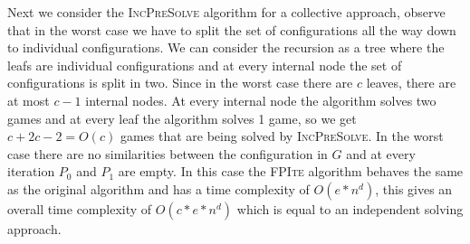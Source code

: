 Next we consider the \textsc{IncPreSolve} algorithm for a collective approach, observe that in the worst case we have to split the set of configurations all the way down to individual configurations. We can consider the recursion as a tree where the leafs are individual configurations and at every internal node the set of configurations is split in two. Since in the worst case there are $c$ leaves, there are at most $c-1$ internal nodes. At every internal node the algorithm solves two games and at every leaf the algorithm solves 1 game, so we get $c + 2c - 2 = O(c)$ games that are being solved by \textsc{IncPreSolve}. In the worst case there are no similarities between the configuration in $G$ and at every iteration $P_0$ and $P_1$ are empty. In this case the \textsc{FPIte} algorithm behaves the same as the original algorithm and has a time complexity of $O(e*n^d)$, this gives an overall time complexity of $O(c*e*n^d)$ which is equal to an independent solving approach.